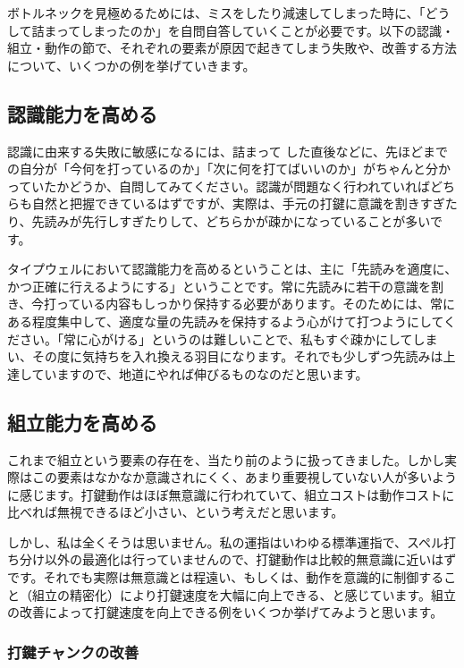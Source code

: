 ボトルネックを見極めるためには、ミスをしたり減速してしまった時に、「どうして詰まってしまったのか」を自問自答していくことが必要です。以下の認識・組立・動作の節で、それぞれの要素が原因で起きてしまう失敗や、改善する方法について、いくつかの例を挙げていきます。

\subsection{認識能力を高める}

認識に由来する失敗に敏感になるには、詰まって した直後などに、先ほどまでの自分が「今何を打っているのか」「次に何を打てばいいのか」がちゃんと分かっていたかどうか、自問してみてください。認識が問題なく行われていればどちらも自然と把握できているはずですが、実際は、手元の打鍵に意識を割きすぎたり、先読みが先行しすぎたりして、どちらかが疎かになっていることが多いです。

タイプウェルにおいて認識能力を高めるということは、主に「先読みを適度に、かつ正確に行えるようにする」ということです。常に先読みに若干の意識を割き、今打っている内容もしっかり保持する必要があります。そのためには、常にある程度集中して、適度な量の先読みを保持するよう心がけて打つようにしてください。「常に心がける」というのは難しいことで、私もすぐ疎かにしてしまい、その度に気持ちを入れ換える羽目になります。それでも少しずつ先読みは上達していますので、地道にやれば伸びるものなのだと思います。

\subsection{組立能力を高める}

これまで組立という要素の存在を、当たり前のように扱ってきました。しかし実際はこの要素はなかなか意識されにくく、あまり重要視していない人が多いように感じます。打鍵動作はほぼ無意識に行われていて、組立コストは動作コストに比べれば無視できるほど小さい、という考えだと思います。

しかし、私は全くそうは思いません。私の運指はいわゆる標準運指で、スペル打ち分け以外の最適化は行っていませんので、打鍵動作は比較的無意識に近いはずです。それでも実際は無意識とは程遠い、もしくは、動作を意識的に制御すること（組立の精密化）により打鍵速度を大幅に向上できる、と感じています。組立の改善によって打鍵速度を向上できる例をいくつか挙げてみようと思います。

\subsubsection*{打鍵チャンクの改善}

